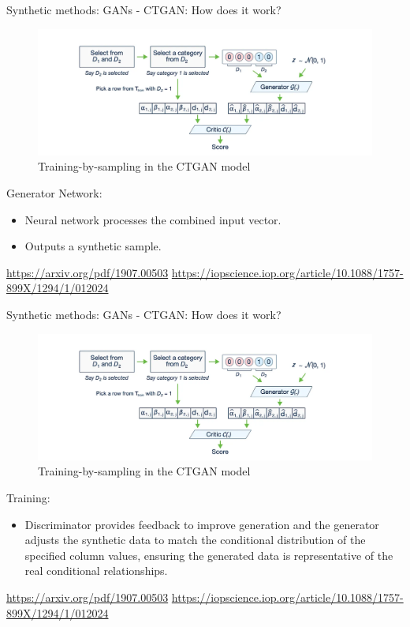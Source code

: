 \documentclass[
	aspectratio = 169
 ]{beamer}
\begin{document}
\begin{frame}{Synthetic methods: GANs - CTGAN: How does it work?}

      \begin{figure}
      \centering
      \includegraphics[width=0.6\linewidth]{Presentation TEX/gallery/training-by-sampling.png}
  \caption{Training-by-sampling in the CTGAN model}
  \end{figure}
    Generator Network:
    \begin{itemize}
        \item Neural network processes the combined input vector.
        \item Outputs a synthetic sample.
    \end{itemize}
\vspace{2.5mm}
\newline
\tiny{\url{https://arxiv.org/pdf/1907.00503}}
\newline
\tiny{\url{https://iopscience.iop.org/article/10.1088/1757-899X/1294/1/012024}}

\end{frame}
\begin{frame}{Synthetic methods: GANs - CTGAN: How does it work?}

      \begin{figure}
      \centering
      \includegraphics[width=0.6\linewidth]{Presentation TEX/gallery/training-by-sampling.png}
  \caption{Training-by-sampling in the CTGAN model}
  \end{figure}
    Training:
    \begin{itemize}
       \item Discriminator provides feedback to improve generation and the generator adjusts the synthetic data to match the conditional distribution of the specified column values, ensuring the generated data is representative of the real conditional relationships.
    \end{itemize}
\vspace{2.5mm}
\newline
\tiny{\url{https://arxiv.org/pdf/1907.00503}}
\newline
\tiny{\url{https://iopscience.iop.org/article/10.1088/1757-899X/1294/1/012024}}

\end{frame}
\end{document}
